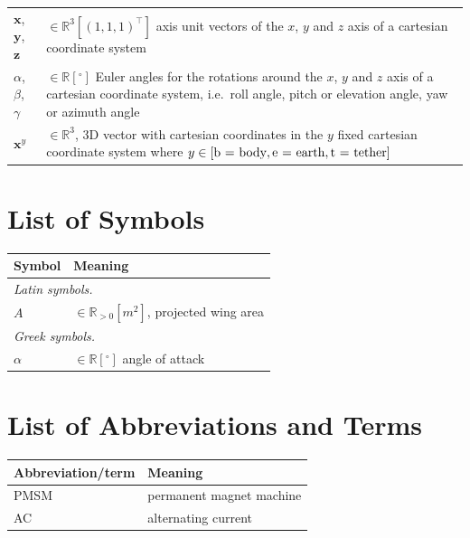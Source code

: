 \documentclass[journal]{IEEEtran}
\renewcommand{\t}[1]{\text{\normalfont{#1}}} %
\renewcommand{\v}{\boldsymbol} %
\newcommand{\T}{\top} %
\newcommand{\F}[1]{\mathbb{#1}} %
\newcommand{\uv}[1]{\unit{\left[#1\right]}} %
\begin{document}
{\begin{longtable}[H]{p{3cm}p{11cm}}
		\\\hline
				$\v{x}$, $\v{y}$, $\v{z}$
			&
				$\in \F{R}^3 \uv{(1, 1, 1)^\T}$
				axis unit vectors of the $x$, $y$ and $z$ axis of a cartesian coordinate system
		\\
				$\alpha$, $\beta$, $\gamma$
			&
				$\in \F{R} \uv{^\circ}$
				Euler angles for the rotations around the $x$, $y$ and $z$ axis of a cartesian coordinate system, i.e.\ roll angle, pitch or elevation angle, yaw or azimuth angle
		\\\hline
				$\v{x}^y$
			&
				$\in \F{R}^3$, 3D vector with cartesian coordinates in the $y$ fixed cartesian coordinate system where $y \in [ \t{b = body}, \t{e = earth}, \t{t = tether} ]$
	\end{longtable}
	
	
	\newpage
	
	\chapter*{List of Symbols}
	
	\begin{longtable}[H]{p{3cm}p{11cm}}
				\textsf{\textbf{Symbol}}
			&
				\textsf{\textbf{Meaning}}
		\\\hline\endhead
			\multicolumn{2}{l}{\textit{Latin symbols.}}
		\\
				$A$
			&
				$\in \F{R}_{> 0} \unit{[m^2]}$, projected wing area
		\\\hline%
			\multicolumn{2}{l}{\textit{Greek symbols.}}
		\\
				$\alpha$
			&
				$\in \F{R} \unit{[^\circ]}$
				angle of attack
	\end{longtable}
	
	
	
	\chapter*{List of Abbreviations and Terms}
	
	\begin{longtable}[H]{p{3cm}p{11cm}}
				\textsf{\textbf{Abbreviation/term}}
			&
				\textsf{\textbf{Meaning}}
		\\\hline\endhead
				PMSM
			&
				permanent magnet machine
		\\
				AC
			&
				alternating current
	\end{longtable}
	
}{}
\end{document}
